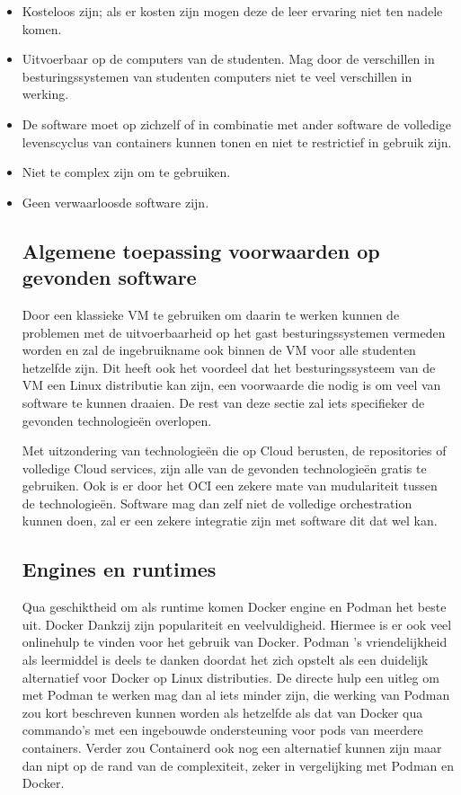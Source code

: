 \begin{itemize}
    \item Kosteloos zijn; als er kosten zijn mogen deze de leer ervaring niet ten nadele komen.
    \item Uitvoerbaar op de computers van de studenten. Mag door de verschillen in besturingssystemen van studenten computers niet te veel verschillen in werking.
    \item De software moet op zichzelf of in combinatie met ander software de volledige levenscyclus van containers kunnen tonen en niet te restrictief in gebruik zijn.
    \item Niet te complex zijn om te gebruiken.
    \item Geen verwaarloosde software zijn.
    
\subsection{Algemene toepassing voorwaarden op gevonden software}
Door een klassieke VM te gebruiken om daarin te werken kunnen de problemen met de uitvoerbaarheid op het gast besturingssystemen vermeden worden en zal de ingebruikname ook binnen de VM voor alle studenten hetzelfde zijn. Dit heeft ook het voordeel dat het besturingssysteem van de VM een Linux distributie kan zijn, een voorwaarde die nodig is om veel van software te kunnen draaien. De rest van deze sectie zal iets specifieker de gevonden technologieën overlopen.

Met uitzondering van technologieën die op Cloud berusten, de repositories of volledige Cloud services, zijn alle van de gevonden technologieën gratis te gebruiken. Ook is er door het OCI een zekere mate van mudulariteit tussen de technologieën. Software mag dan zelf niet de volledige orchestration kunnen doen, zal er een zekere integratie zijn met software dit dat wel kan.

\subsection{Engines en runtimes}
Qua geschiktheid om als runtime komen Docker engine en Podman het beste uit. Docker Dankzij zijn populariteit en veelvuldigheid. Hiermee is er ook veel onlinehulp te vinden voor het gebruik van Docker. Podman ’s vriendelijkheid als leermiddel is deels te danken doordat het zich opstelt als een duidelijk alternatief voor Docker op Linux distributies. De directe hulp een uitleg om met Podman te werken mag dan al iets minder zijn, die werking van Podman zou kort beschreven kunnen worden als hetzelfde als dat van Docker qua commando’s met een ingebouwde ondersteuning voor pods van meerdere containers.  Verder zou Containerd ook nog een alternatief kunnen zijn maar dan nipt op de rand van de complexiteit, zeker in vergelijking met Podman en Docker.


\end{itemize}
